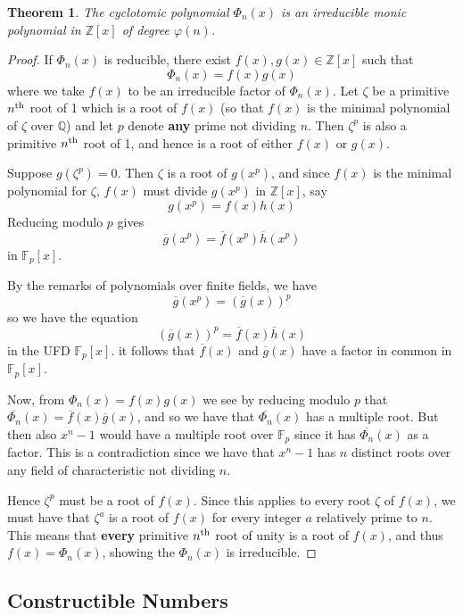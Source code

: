 \documentclass[10pt, oneside, reqno]{amsart}
\theoremstyle{plain}%
\newtheorem{thm}{Theorem}[section]
\theoremstyle{definition}
\theoremstyle{remark}
\newcommand{\Q}{\mathbb{Q}}
\newcommand{\Z}{\mathbb{Z}}
\newcommand{\F}{\mathbb{F}}
\newcommand{\nth}{n\textsuperscript{th}}
\begin{document}
\begin{thm}
	The cyclotomic polynomial $\Phi_n(x)$ is an irreducible monic polynomial in $\Z[x]$ of degree $\varphi(n)$.
\end{thm}
\begin{proof}
	If $\Phi_n(x)$ is reducible, there exist $f(x), g(x) \in \Z[x]$ such that \[
		\Phi_n(x) = f(x) g(x)
	\] where we take $f(x)$ to be an irreducible factor of $\Phi_n(x)$.  Let $\zeta$ be a primitive $\nth$ root of 1 which is a root of $f(x)$ (so that $f(x)$ is the minimal polynomial of $\zeta$ over $\Q$) and let $p$ denote \textbf{any} prime not dividing $n$.  Then $\zeta^p$ is also a primitive $\nth$ root of 1, and hence is a root of either $f(x)$ or $g(x)$.
	
	Suppose $g(\zeta^p) = 0$.  Then $\zeta$ is a root of $g(x^p)$, and since $f(x)$ is the minimal polynomial for $\zeta$, $f(x)$ must divide $g(x^p)$ in $\Z[x]$, say \[
		g(x^p) = f(x) h(x)
	\] Reducing modulo $p$ gives \[
		\overline{g}(x^p) = \overline{f}(x^p) \overline{h}(x^p)
	\] in $\F_p[x]$. 
	
	By the remarks of polynomials over finite fields, we have\[
		\overline{g}(x^p) = (\overline{g}(x))^p
	\] so we have the equation \[
		(\overline{g}(x))^p = \overline{f}(x)\overline{h}(x)
	\] in the UFD $\F_p[x]$.  it follows that $\overline{f}(x)$ and $\overline{g}(x)$ have a factor in common in $\F_p[x]$.
	
	Now, from $\Phi_n(x) = f(x)g(x)$ we see by reducing modulo $p$ that $\overline{\Phi_n}(x) = \overline{f}(x) \overline{g}(x)$, and so we have that $\overline{\Phi_n}(x)$ has a multiple root.  But then also $x^n - 1$ would have a multiple root over $\F_p$ since it has $\overline{\Phi_n}(x)$ as a factor.  This is a contradiction since we have that $x^n - 1$ has $n$ distinct roots over any field of characteristic not dividing $n$. 
	
	Hence $\zeta^p$ must be a root of $f(x)$.  Since this applies to every root $\zeta$ of $f(x)$, we must have that $\zeta^a$ is a root of $f(x)$ for every integer $a$ relatively prime to $n$.  This means that \textbf{every} primitive $\nth$ root of unity is a root of $f(x)$, and thus $f(x) = \Phi_n(x)$, showing the $\Phi_n(x)$ is irreducible.
\end{proof}



\subsection{Constructible Numbers} %
\label{sub:constructible_number}
\end{document}
